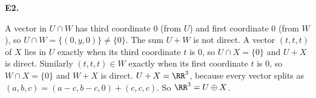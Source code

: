 \documentclass[10pt]{scrartcl}
\begin{document}
\begin{prob}\textbf{E2.}\par{}
\begin{steps}
  \ii A vector in $U\cap W$ has third coordinate $0$ (from $U$) and first coordinate $0$ (from $W$), so $U\cap W=\{(0,y,0)\}\ne\{0\}$. The sum $U+W$ is not direct.
  \ii A vector $(t,t,t)$ of $X$ lies in $U$ exactly when its third coordinate $t$ is $0$, so $U\cap X=\{0\}$ and $U+X$ is direct. Similarly $(t,t,t)\in W$ exactly when its first coordinate $t$ is $0$, so $W\cap X=\{0\}$ and $W+X$ is direct.
  \ii $U+X=\RR^3$, because every vector splits as $(a,b,c)=(a-c,b-c,0)+(c,c,c)$. So $\RR^3=U\oplus X$.
\end{steps}
\end{prob}
\end{document}
